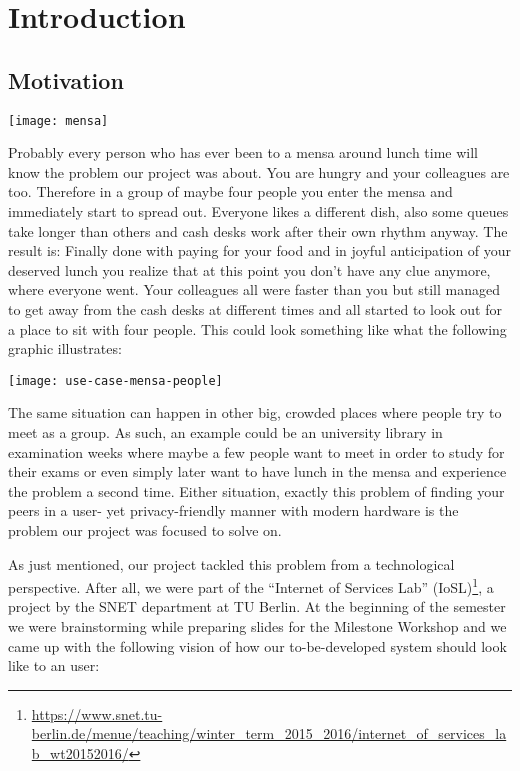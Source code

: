 \chapter{Introduction}
\label{cha:introduction}


\section{Motivation}

\begin{center}
    \texttt{[image: mensa]}\\
\end{center}

Probably every person who has ever been to a mensa around lunch time will know the problem our project was about. You are hungry and your colleagues are too. Therefore in a group of maybe four people you enter the mensa and immediately start to spread out. Everyone likes a different dish, also some queues take longer than others and cash desks work after their own rhythm anyway. The result is: Finally done with paying for your food and in joyful anticipation of your deserved lunch you realize that at this point you don't have any clue anymore, where everyone went. Your colleagues all were faster than you but still managed to get away from the cash desks at different times and all started to look out for a place to sit with four people. This could look something like what the following graphic illustrates:

\begin{center}
    \texttt{[image: use-case-mensa-people]}\\
\end{center}

The same situation can happen in other big, crowded places where people try to meet as a group. As such, an example could be an university library in examination weeks where maybe a few people want to meet in order to study for their exams or even simply later want to have lunch in the mensa and experience the problem a second time. Either situation, exactly this problem of finding your peers in a user- yet privacy-friendly manner with modern hardware is the problem our project was focused to solve on.

As just mentioned, our project tackled this problem from a technological perspective. After all, we were part of the \enquote{Internet of Services Lab} (IoSL)\footnote{\url{https://www.snet.tu-berlin.de/menue/teaching/winter_term_2015_2016/internet_of_services_lab_wt20152016/}}, a project by the SNET department at TU Berlin. At the beginning of the semester we were brainstorming while preparing slides for the Milestone Workshop and we came up with the following vision of how our to-be-developed system should look like to an user:

